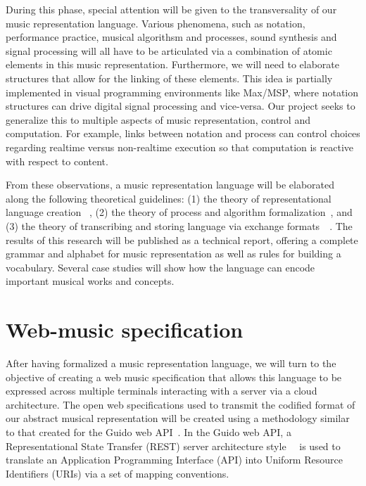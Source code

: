 \documentclass{article}
\begin{document}
During this phase, special attention will be given to the transversality of
our music representation language.  Various phenomena, such as notation,
performance practice, musical algorithsm and processes, sound synthesis and
signal processing will all have to be articulated via a combination of
atomic elements in this music representation.  Furthermore, we will need to
elaborate structures that allow for the linking of these elements.
This idea is partially implemented in visual programming environments like Max/MSP, where notation
structures can drive digital signal processing and vice-versa. Our project
seeks to generalize this to multiple aspects of music representation, control and
computation. For example, links between notation and process can control choices regarding
real\-time versus non-real\-time execution so that computation is reactive with
respect to content.

From these observations, a music representation language will be elaborated
along the following theoretical guidelines: (1) the theory of
representational language creation \cite{wagner2002design}~\cite{shieber1984design},
(2) the theory of process and algorithm
formalization~\cite{salwicki1970formalized}, and
(3) the theory of transcribing and storing language via exchange
formats~\cite{qiu1999programming}~\cite{gruber1993translation}. The
results of this research will be published as a technical report, offering a
complete grammar and alphabet for music representation as well as rules for
building a vocabulary. Several case studies will show how the language can
encode important musical works and concepts.

\section{Web-music specification}\label{sec:web-music-specification}
After having formalized a music representation language, we will turn to the
objective of creating a web music specification that allows this language to be
expressed across multiple terminals interacting with a server via a cloud
architecture. The open web specifications used to transmit the codified format
of our abstract musical representation will be created using a methodology
similar to that created for the Guido web API~\cite{solomon:2014}.
In the Guido web API, a Representational State Transfer (REST) server architecture
style~\cite{Fielding00}~\cite{richardson2008restful} is used to translate an Application
Programming Interface (API) into Uniform Resource Identifiers (URIs) via a
set of mapping conventions.
\end{document}
